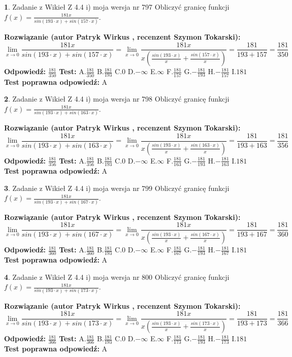 \documentclass[12pt, a4paper]{article}
\theoremstyle{definition} %
\newtheorem{zad}{}
\newcommand{\zadStart}[1]{\begin{zad}#1\newline}
\newcommand{\zadStop}{\end{zad}}
\newcommand{\rozwStart}[2]{\noindent \textbf{Rozwiązanie (autor #1 , recenzent #2): }\newline}
\newcommand{\rozwStop}{\newline}
\newcommand{\odpStart}{\noindent \textbf{Odpowiedź:}\newline}
\newcommand{\odpStop}{\newline}
\newcommand{\testStart}{\noindent \textbf{Test:}\newline}
\newcommand{\testStop}{\newline}
\newcommand{\kluczStart}{\noindent \textbf{Test poprawna odpowiedź:}\newline}
\newcommand{\kluczStop}{\newline}
\begin{document}
\zadStart{Zadanie z Wikieł Z 4.4 i) moja wersja nr 797}
Obliczyć granicę funkcji $f(x)=\frac{181x}{sin(193\cdot x) +sin(157\cdot x)}$.
\zadStop
\rozwStart{Patryk Wirkus}{Szymon Tokarski}
$$\lim\limits_{x\to 0}\frac{181x}{sin(193\cdot x) +sin(157\cdot x)}=\lim\limits_{x\to 0}\frac{181x}{x(\frac{sin(193\cdot x)}{x}+\frac{sin(157\cdot x)}{x})}=\frac{181}{193+157} = \frac{181}{350}$$
\rozwStop
\odpStart
$\frac{181}{350}$
\odpStop
\testStart
A.$\frac{181}{350}$
B.$\frac{181}{193}$
C.$0$
D.$-\infty$
E.$\infty$
F.$\frac{181}{157}$
G.$-\frac{181}{193}$
H.$-\frac{181}{157}$
I.$181$
\testStop
\kluczStart
A
\kluczStop



\zadStart{Zadanie z Wikieł Z 4.4 i) moja wersja nr 798}
Obliczyć granicę funkcji $f(x)=\frac{181x}{sin(193\cdot x) +sin(163\cdot x)}$.
\zadStop
\rozwStart{Patryk Wirkus}{Szymon Tokarski}
$$\lim\limits_{x\to 0}\frac{181x}{sin(193\cdot x) +sin(163\cdot x)}=\lim\limits_{x\to 0}\frac{181x}{x(\frac{sin(193\cdot x)}{x}+\frac{sin(163\cdot x)}{x})}=\frac{181}{193+163} = \frac{181}{356}$$
\rozwStop
\odpStart
$\frac{181}{356}$
\odpStop
\testStart
A.$\frac{181}{356}$
B.$\frac{181}{193}$
C.$0$
D.$-\infty$
E.$\infty$
F.$\frac{181}{163}$
G.$-\frac{181}{193}$
H.$-\frac{181}{163}$
I.$181$
\testStop
\kluczStart
A
\kluczStop



\zadStart{Zadanie z Wikieł Z 4.4 i) moja wersja nr 799}
Obliczyć granicę funkcji $f(x)=\frac{181x}{sin(193\cdot x) +sin(167\cdot x)}$.
\zadStop
\rozwStart{Patryk Wirkus}{Szymon Tokarski}
$$\lim\limits_{x\to 0}\frac{181x}{sin(193\cdot x) +sin(167\cdot x)}=\lim\limits_{x\to 0}\frac{181x}{x(\frac{sin(193\cdot x)}{x}+\frac{sin(167\cdot x)}{x})}=\frac{181}{193+167} = \frac{181}{360}$$
\rozwStop
\odpStart
$\frac{181}{360}$
\odpStop
\testStart
A.$\frac{181}{360}$
B.$\frac{181}{193}$
C.$0$
D.$-\infty$
E.$\infty$
F.$\frac{181}{167}$
G.$-\frac{181}{193}$
H.$-\frac{181}{167}$
I.$181$
\testStop
\kluczStart
A
\kluczStop



\zadStart{Zadanie z Wikieł Z 4.4 i) moja wersja nr 800}
Obliczyć granicę funkcji $f(x)=\frac{181x}{sin(193\cdot x) +sin(173\cdot x)}$.
\zadStop
\rozwStart{Patryk Wirkus}{Szymon Tokarski}
$$\lim\limits_{x\to 0}\frac{181x}{sin(193\cdot x) +sin(173\cdot x)}=\lim\limits_{x\to 0}\frac{181x}{x(\frac{sin(193\cdot x)}{x}+\frac{sin(173\cdot x)}{x})}=\frac{181}{193+173} = \frac{181}{366}$$
\rozwStop
\odpStart
$\frac{181}{366}$
\odpStop
\testStart
A.$\frac{181}{366}$
B.$\frac{181}{193}$
C.$0$
D.$-\infty$
E.$\infty$
F.$\frac{181}{173}$
G.$-\frac{181}{193}$
H.$-\frac{181}{173}$
I.$181$
\testStop
\kluczStart
A
\kluczStop
\end{document}
